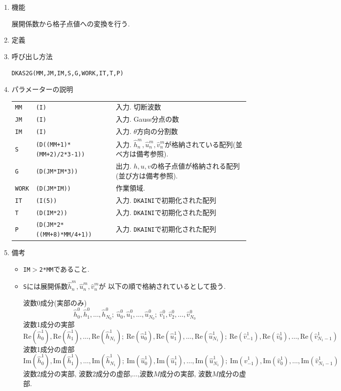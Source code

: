 \documentclass[a4j,fleqn]{jarticle}
\begin{document}
\begin{enumerate}

\item 機能

展開係数から格子点値への変換を行う.

\item 定義

\item 呼び出し方法 
    
{\tt DKAS2G(MM,JM,IM,S,G,WORK,IT,T,P)}
  
\item パラメーターの説明 
    
\begin{tabular}{lll}
{\tt MM} & {\tt (I)} & 入力. 切断波数\\
{\tt JM} & {\tt (I)} & 入力. Gauss分点の数\\
{\tt IM} & {\tt (I)} & 入力. $\theta$方向の分割数\\
{\tt S}   & {\tt (D((MM+1)*(MM+2)/2*3-1))} & 入力. $\hat h^m_n,\hat u^m_n,\hat
v^m_n$が格納されている配列(並べ方は備考参照).\\
{\tt G}   & {\tt (D(JM*IM*3))} & 出力. $h,u,v$の格子点値が格納される配列
(並び方は備考参照).\\
{\tt WORK}   & {\tt (D(JM*IM))} & 作業領域.\\
{\tt IT}  & {\tt (I(5))}    & 入力. {\tt DKAINI}で初期化された配列\\
{\tt T}   & {\tt (D(IM*2))} & 入力. {\tt DKAINI}で初期化された配列\\
{\tt P}  & {\tt (D(JM*2*((MM+8)*MM/4+1))} & 入力. {\tt DKAINI}で初期化された配列
\end{tabular}

\item 備考

\begin{itemize}

\item {\tt IM}$>${\tt 2*MM}であること.

\item {\tt S}には展開係数$\hat h^m_n,\hat u^m_n,\hat v^m_n$が
以下の順で格納されているとして扱う.

波数0成分(実部のみ)
\[
\hat h^0_0, \hat h^0_1, \dots, \hat h^0_{N_0};\ 
\hat u^0_0, \hat u^0_1, \dots, \hat u^0_{N_0};\
\hat v^0_1, \hat v^0_2, \dots, \hat v^0_{N_0}
\]
波数1成分の実部
\[
\mbox{Re}(\hat h^1_0), \mbox{Re}(\hat h^1_1), \dots, 
\mbox{Re}(\hat h^1_{N_1});\ 
\mbox{Re}(\hat u^1_0), \mbox{Re}(\hat u^1_1), \dots, 
\mbox{Re}(\hat u^1_{N_1});\ 
\mbox{Re}(\hat v^1_{-1}), \mbox{Re}(\hat v^1_0), \dots, 
\mbox{Re}(\hat v^1_{N_1-1})
\]
波数1成分の虚部
\[
\mbox{Im}(\hat h^1_0), \mbox{Im}(\hat h^1_1), \dots, 
\mbox{Im}(\hat h^1_{N_1});\ 
\mbox{Im}(\hat u^1_0), \mbox{Im}(\hat u^1_1), \dots, 
\mbox{Im}(\hat u^1_{N_1});\ 
\mbox{Im}(\hat v^1_{-1}), \mbox{Im}(\hat v^1_0), \dots, 
\mbox{Im}(\hat v^1_{N_1-1})
\]
波数2成分の実部, 波数2成分の虚部,$\dots$,波数$M$成分の実部, 波数$M$成分の虚部.



\end{itemize}
\end{enumerate}
\end{document}
